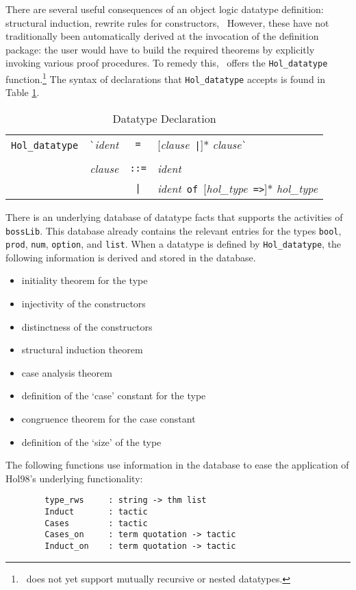 \documentclass[12pt,fleqn,layout,a4paper]{report}
\newcommand{\ident}      {\mbox{\it ident}}
\newcommand{\clause}      {\mbox{\it clause}}
\newcommand{\type}       {\mbox{\it hol\_type}}
\begin{document}
There are several useful consequences of an object logic datatype
definition: structural induction, rewrite rules for constructors, \etc\
However, these have not traditionally been automatically derived
at the invocation of the definition package: the user would have to
build the required theorems by explicitly invoking various proof
procedures.  To remedy this, \bossLib\ offers the
\verb+Hol_datatype+ function.\footnote{\bossLib\ does not yet
support mutually recursive or nested datatypes.} The syntax of
declarations that \verb+Hol_datatype+ accepts is found in Table
\ref{datatype}.
\begin{table}[h]
\begin{center}
\begin{tabular}{|rcl|} \hline
\verb+Hol_datatype +\ \verb+`+\ident & \verb+=+ & [\clause\ \verb+|+]* \clause\verb+`+ \\
       & & \\
\clause & \verb+::=+ & \ident \\
        & \verb+|+ & \ident\ \verb+of+\ [\type\ \verb+=>+]* \type\\ \hline
\end{tabular}
\caption{Datatype Declaration}\label{datatype}
\end{center}
\end{table}

There is an underlying database of datatype facts that supports the
activities of \verb+bossLib+. This database already contains the
relevant entries for the types \verb+bool+, \verb+prod+, \verb+num+,
\verb+option+, and \verb+list+.  When a datatype is defined by
\verb+Hol_datatype+, the following information is derived and stored in
the database.

\begin{itemize}
\item initiality theorem for the type
\item injectivity of the constructors
\item distinctness of the constructors
\item structural induction theorem
\item case analysis theorem
\item definition of the `case' constant for the type
\item congruence theorem for the case constant
\item definition of the `size' of the type
\end{itemize}

The following functions use information in the database to ease the
application of Hol98's underlying functionality:
\begin{verbatim}
        type_rws     : string -> thm list
        Induct       : tactic
        Cases        : tactic
        Cases_on     : term quotation -> tactic
        Induct_on    : term quotation -> tactic
\end{verbatim}
\end{document}
